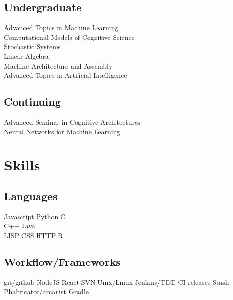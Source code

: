 \documentclass[]{csaund_resume-openfont}
\begin{document}
\begin{minipage}[t]{0.30\textwidth}
\subsection{Undergraduate}
Advanced Topics in Machine Learning \\
Computational Models of Cognitive Science \\
Stochastic Systems \\
Linear Algebra \\
Machine Architecture and Assembly \\
Advanced Topics in Artificial Intelligence \\
\sectionsep

\subsection{Continuing}
Advanced Seminar in Cognitive Architectures \\
Neural Networks for Machine Learning 


\section{Skills}
\subsection{Languages}
Javascript \textbullet{} Python \textbullet{} C \\
C++ \textbullet{} Java  \\
LISP \textbullet{} CSS \textbullet{} HTTP \textbullet{} R \\
\vspace{\topsep} %

\subsection{Workflow/Frameworks}
git/github \textbullet{} NodeJS  \textbullet{} React \textbullet{} SVN \textbullet{}  Unix/Linux \textbullet{} Jenkins/TDD \textbullet{} CI releases \textbullet{}
 Stash \textbullet{} Phabricator/arcanist \textbullet{} Gradle
\sectionsep

%
%

\end{minipage}
\end{document}
